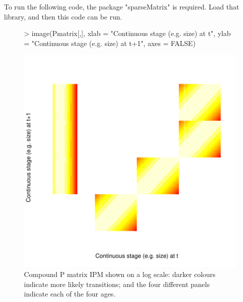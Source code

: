 \documentclass{article}
\begin{document}
To run the following code, the package "sparseMatrix" is required.  Load that
library, and then this code can be run.
\begin{figure}
\begin{center}
\begin{Schunk}
\begin{Sinput}
> image(Pmatrix[,],
  	xlab = "Continuous stage (e.g. size) at t",
  		ylab = "Continuous stage (e.g. size) at t+1", axes = FALSE)
\end{Sinput}
\end{Schunk}
\includegraphics{IPMpack_Vignette-figCompound}
\end{center}
\caption{Compound P matrix IPM shown on a log scale: darker colours indicate
  more likely transitions; and the four different panels indicate each
  of the four ages.}
\label{fig:compound}
\end{figure}
\end{document}
